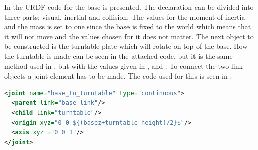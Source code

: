 In  the URDF code for the base is presented. The declaration can be divided into three parts: visual, inertial and collision. The values for the moment of inertia and the mass is set to one since the base is fixed to the world which means that it will not move and the values chosen for it does not matter. The next object to be constructed is the turntable plate which will rotate on top of the base. How the turntable is made can be seen in the attached code, but it is the same method used in , but with the values given in ,  and . To connect the two link objects a joint element has to be made. The code used for this is seen in :

\begin{lstlisting}[language=xml,caption={joint between base and turntable},label={lst:jointBTT}]
<joint name="base_to_turntable" type="continuous">
  <parent link="base_link"/>
  <child link="turntable"/>
  <origin xyz="0 0 ${(basez+turntable_height)/2}$"/>
  <axis xyz ="0 0 1"/>
</joint>
\end{lstlisting}

